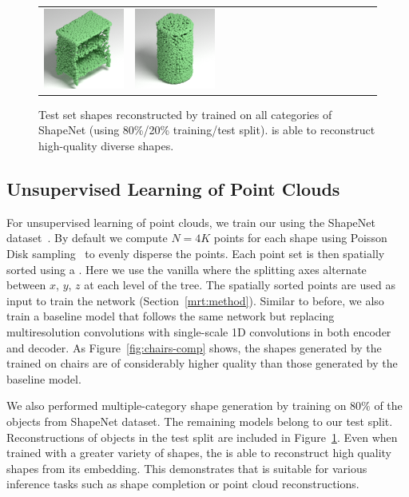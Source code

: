 \begin{figure}[t]
\begin{tabular}{cccccccccccccccc}
\includegraphics[width=.1\linewidth]{MRTNet/rendering/selected/rec_shapenet/pc_0048.png} &
\includegraphics[width=.1\linewidth]{MRTNet/rendering/selected/rec_shapenet/pc_0054.png}
\end{tabular}
\vspace{-12pt}
    \caption{\label{mrt:gallery} 
    \small Test set shapes reconstructed by \mrvae trained on all categories of ShapeNet (using 80\%/20\% training/test split). \mrvae is able to reconstruct high-quality diverse shapes.}
    \vspace{-8pt}
\end{figure}

\subsection{Unsupervised Learning of Point Clouds} \label{sec:exp_gen}
For unsupervised learning of point clouds, we train our \mrvae using the ShapeNet dataset~\cite{chang2015shapenet}. 
By default we compute $N=4K$ points for each shape using Poisson Disk sampling~\cite{Bowers:2010:PPD} to evenly disperse the points. 
Each point set is then spatially sorted using a \kdtree. 
Here we use the vanilla \kdtree where the splitting axes alternate between $x$, $y$, $z$ at each level of the tree. 
The spatially sorted points are used as input to train the \mrvae network (Section~\ref{mrt:method}). 
Similar to before, we also train a baseline model that follows the same network but replacing multiresolution convolutions with single-scale 1D convolutions
in both encoder and decoder. 
As Figure~\ref{fig:chairs-comp} shows, the shapes generated by the \mrvae trained on chairs are of considerably higher quality than those generated by the baseline model. 

We also performed multiple-category shape generation by training \mrvae on $80\%$ of the objects from ShapeNet dataset. 
The remaining models belong to our test split. 
Reconstructions of objects in the test split are included in Figure~\ref{mrt:gallery}. 
Even when trained with a greater variety of shapes, the \mrvae is able to reconstruct high quality shapes from its embedding. 
This demonstrates that \mrvae is suitable for various inference tasks such as shape completion or point cloud reconstructions.

